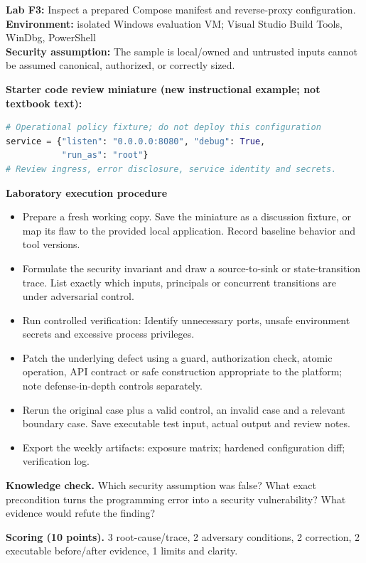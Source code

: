 \documentclass[10pt,letterpaper]{article}
\begin{document}
\begin{insight}\textbf{Lab F3:} Inspect a prepared Compose manifest and reverse-proxy configuration.\\\textbf{Environment:} isolated Windows evaluation VM; Visual Studio Build Tools, WinDbg, PowerShell\\\textbf{Security assumption:} The sample is local/owned and untrusted inputs cannot be assumed canonical, authorized, or correctly sized.\end{insight}
\textbf{Starter code review miniature (new instructional example; not textbook text):}
\begin{lstlisting}[language=Python]
# Operational policy fixture; do not deploy this configuration
service = {"listen": "0.0.0.0:8080", "debug": True,
           "run_as": "root"}
# Review ingress, error disclosure, service identity and secrets.
\end{lstlisting}
\textbf{Laboratory execution procedure}
\begin{itemize}[leftmargin=*,itemsep=2pt]
\item Prepare a fresh working copy. Save the miniature as a discussion fixture, or map its flaw to the provided local application. Record baseline behavior and tool versions.
\item Formulate the security invariant and draw a source-to-sink or state-transition trace. List exactly which inputs, principals or concurrent transitions are under adversarial control.
\item Run controlled verification: Identify unnecessary ports, unsafe environment secrets and excessive process privileges.
\item Patch the underlying defect using a guard, authorization check, atomic operation, API contract or safe construction appropriate to the platform; note defense-in-depth controls separately.
\item Rerun the original case plus a valid control, an invalid case and a relevant boundary case. Save executable test input, actual output and review notes.
\item Export the weekly artifacts: exposure matrix; hardened configuration diff; verification log.
\end{itemize}
\textbf{Knowledge check.} Which security assumption was false? What exact precondition turns the programming error into a security vulnerability? What evidence would refute the finding?

\textbf{Scoring (10 points).} 3 root-cause/trace, 2 adversary conditions, 2 correction, 2 executable before/after evidence, 1 limits and clarity.
\end{document}

